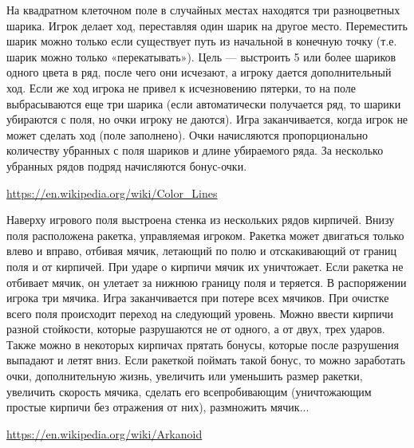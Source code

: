\begin{zztask}[Lines, 1992]
На квадратном клеточном поле в случайных местах находятся три разноцветных
шарика. Игрок делает ход, переставляя один шарик на другое место. Переместить
шарик можно только если существует путь из начальной в конечную точку (т.е.
шарик можно только «перекатывать»). Цель — выстроить 5 или более шариков
одного цвета в ряд, после чего они исчезают, а игроку дается дополнительный
ход. Если же ход игрока не привел к исчезновению пятерки, то на поле
выбрасываются еще три шарика (если автоматически получается ряд, то шарики
убираются с поля, но очки игроку не даются). Игра заканчивается, когда игрок
не может сделать ход (поле заполнено). Очки начисляются пропорционально
количеству убранных с поля шариков и длине убираемого ряда. За несколько
убранных рядов подряд начисляются бонус-очки.
\begin{flushright}
	\url{https://en.wikipedia.org/wiki/Color_Lines}
\end{flushright}
\end{zztask}


\begin{zztask}[Arcanoid, 1986]
Наверху игрового поля выстроена стенка из нескольких рядов кирпичей. Внизу
поля расположена ракетка, управляемая игроком. Ракетка может двигаться только
влево и вправо, отбивая мячик, летающий по полю и отскакивающий от границ поля
и от кирпичей. При ударе о кирпичи мячик их уничтожает. Если ракетка не
отбивает мячик, он улетает за нижнюю границу поля и теряется. В распоряжении
игрока три мячика. Игра заканчивается при потере всех мячиков. При очистке
всего поля происходит переход на следующий уровень. Можно ввести кирпичи
разной стойкости, которые разрушаются не от одного, а от двух, трех ударов.
Также можно в некоторых кирпичах прятать бонусы, которые после разрушения
выпадают и летят вниз. Если ракеткой поймать такой бонус, то можно заработать
очки, дополнительную жизнь, увеличить или уменьшить размер ракетки, увеличить
скорость мячика, сделать его всепробивающим (уничтожающим простые кирпичи без
отражения от них), размножить мячик...
\begin{flushright}
	\url{https://en.wikipedia.org/wiki/Arkanoid}
\end{flushright}
\end{zztask}


